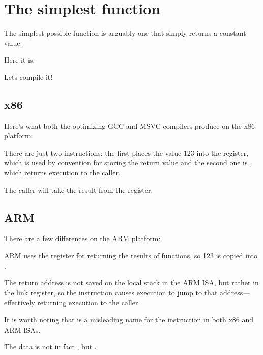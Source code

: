 \section{The simplest function}

The simplest possible function is arguably one that simply returns a constant value:

Here it is:



Lets compile it!

\subsection{x86}

Here's what both the optimizing GCC and MSVC compilers produce on the x86 platform:



There are just two instructions: the first places the value 123 into the \EAX register, 
which is used by convention for storing the return
value and the second one is \RET, which returns execution to the \gls{caller}.

The caller will take the result from the \EAX register.

\subsection{ARM}

There are a few differences on the ARM platform:



ARM uses the register  for returning the results of functions, so 123 is copied into .

The return address is not saved on the local stack in the ARM \ac{ISA}, but rather in the link register, 
so the  instruction causes execution to jump to that address---effectively returning execution to the \gls{caller}.

It is worth noting that \MOV is a misleading name for the instruction in both x86 and ARM \ac{ISA}s.

The data is not in fact , but .

